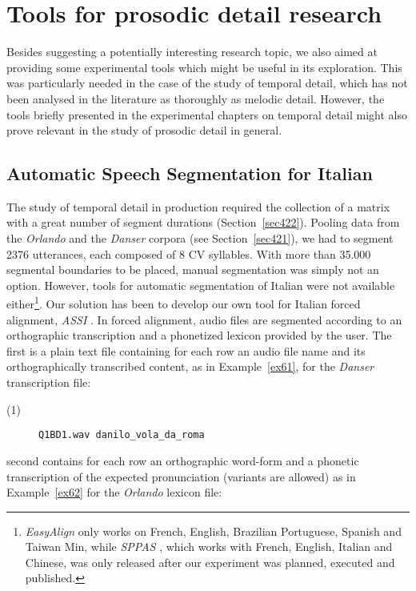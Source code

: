 \section{Tools for prosodic detail research}\label{sec62}
Besides suggesting a potentially interesting research topic, we also aimed at providing some experimental tools which might be useful in its exploration. This was particularly needed in the case of the study of temporal detail, which has not been analysed in the literature as thoroughly as melodic detail. However, the tools briefly presented in the experimental chapters on temporal detail might also prove relevant in the study of prosodic detail in general. 

\subsection{Automatic Speech Segmentation for Italian}\label{sec621}
The study of temporal detail in production required the collection of a matrix with a great number of segment durations (Section~\ref{sec422}). Pooling data from the \textit{Orlando} and the \textit{Danser} corpora (see Section~\ref{sec421}), we had to segment 2376 utterances, each composed of 8 CV syllables. With more than 35.000 segmental boundaries to be placed, manual segmentation was simply not an option. However, tools for automatic segmentation of Italian were not available either\footnote{\textit{EasyAlign} \citep{goldman2011easyalign} only works on French, English, Brazilian Portuguese, Spanish and Taiwan Min, while \textit{SPPAS} \citep{bigi2012speech}, which works with French, English, Italian and Chinese, was only released after our experiment was planned, executed and published.}. Our solution has been to develop our own tool for Italian forced alignment, \textit{ASSI} \citep{cangemi2011automatic}. In forced alignment, audio files are segmented according to an orthographic transcription and a phonetized lexicon provided by the user. The first is a plain text file containing for each row an audio file name and its orthographically transcribed content, as in Example~\ref{ex61}, for the \textit{Danser} transcription file:

\begin{description}
   \item[(1)] {\tt Q1BD1.wav danilo\_vola\_da\_roma}
\end{description}\label{ex61}

\noindent second contains for each row an orthographic word-form and a phonetic transcription of the expected pronunciation (variants are allowed) as in Example~\ref{ex62} for the \textit{Orlando} lexicon file: 

